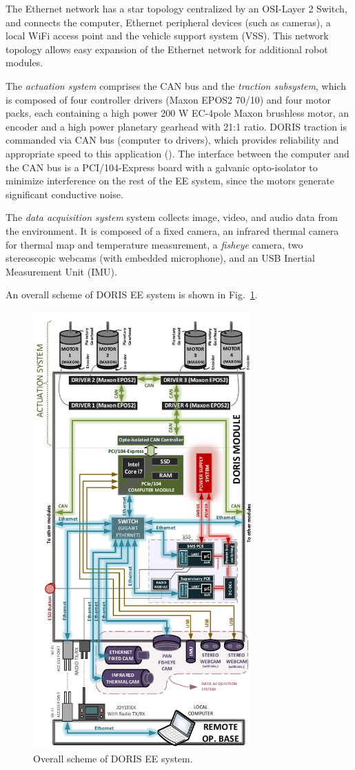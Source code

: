 \documentclass{ifacconf}
\begin{document}
The Ethernet network has a star topology centralized by an OSI-Layer 2 Switch,
and connects the computer, Ethernet peripheral devices (such as cameras), a
local WiFi access point and the vehicle support system (VSS). This network
topology allows easy expansion of the Ethernet network for additional robot
modules. 

The \emph{actuation system} comprises the CAN bus and the \emph{traction
subsystem}, which is composed of four controller drivers (Maxon EPOS2 70/10) and
four motor packs, each containing a high power 200 W EC-4pole Maxon brushless
motor, an encoder and a high power planetary gearhead with 21:1 ratio. DORIS
traction is commanded via CAN bus (computer to drivers), which provides
reliability and appropriate speed to this application (\cite{can}). The
interface between the computer and the CAN bus is a PCI/104-Express board with
a galvanic opto-isolator to minimize interference on the rest of the EE system,
since the motors generate significant conductive noise.
 
The \emph{data acquisition system} system collects image, video, and audio data
from the environment. It is composed of a fixed camera, an infrared thermal
camera for thermal map and temperature measurement, a \emph{fisheye} camera, two
stereoscopic webcams (with embedded microphone), and an USB Inertial Measurement Unit (IMU).

An overall scheme of DORIS EE system is shown in
Fig.~\ref{fig:EE-Communications}.

\begin{figure}
\centering
\includegraphics[width=8.4cm]{figs/EE-Communications-Geral.pdf}
\caption{Overall scheme of DORIS EE system.}
\label{fig:EE-Communications}
\end{figure} 
\end{document}
